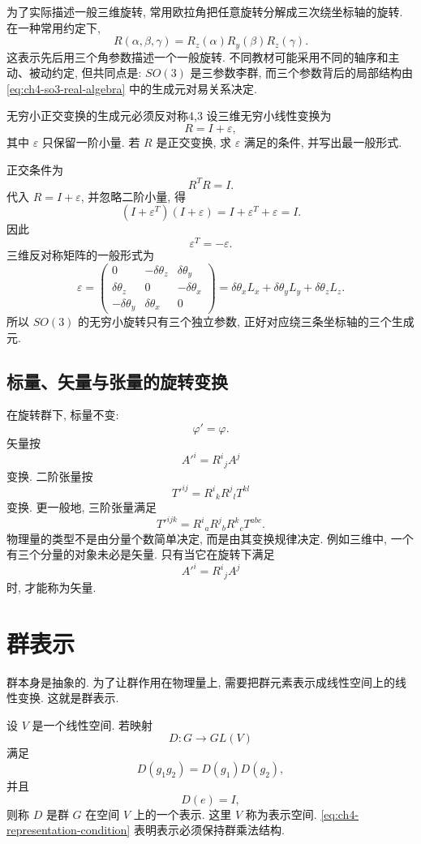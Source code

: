 为了实际描述一般三维旋转, 常用欧拉角把任意旋转分解成三次绕坐标轴的旋转. 在一种常用约定下,
\[
R(\alpha,\beta,\gamma)
=
R_z(\alpha)R_y(\beta)R_z(\gamma).
\]
这表示先后用三个角参数描述一个一般旋转. 不同教材可能采用不同的轴序和主动、被动约定, 但共同点是: $SO(3)$ 是三参数李群, 而三个参数背后的局部结构由 \eqref{eq:ch4-so3-real-algebra} 中的生成元对易关系决定. 

\begin{example}{无穷小正交变换的生成元必须反对称}{4,3}
设三维无穷小线性变换为
\[
R=I+\varepsilon,
\]
其中 $\varepsilon$ 只保留一阶小量. 若 $R$ 是正交变换, 求 $\varepsilon$ 满足的条件, 并写出最一般形式. 
\begin{solution}
正交条件为
\[
R^TR=I.
\]
代入 $R=I+\varepsilon$, 并忽略二阶小量, 得
\[
(I+\varepsilon^T)(I+\varepsilon)
=
I+\varepsilon^T+\varepsilon
=I.
\]
因此
\[
\varepsilon^T=-\varepsilon.
\]
三维反对称矩阵的一般形式为
\[
\varepsilon=
\begin{pmatrix}
0&-\delta\theta_z&\delta\theta_y\\
\delta\theta_z&0&-\delta\theta_x\\
-\delta\theta_y&\delta\theta_x&0
\end{pmatrix}
=
\delta\theta_xL_x+\delta\theta_yL_y+\delta\theta_zL_z.
\]
所以 $SO(3)$ 的无穷小旋转只有三个独立参数, 正好对应绕三条坐标轴的三个生成元. 
\end{solution}
\end{example}

\subsection{标量、矢量与张量的旋转变换}

在旋转群下, 标量不变: 
\[
\varphi'=\varphi.
\]
矢量按
\[
A'^i=R^i{}_jA^j
\]
变换. 二阶张量按
\[
T'^{ij}=R^i{}_kR^j{}_lT^{kl}
\]
变换. 更一般地, 三阶张量满足
\[
T'^{ijk}
=
R^i{}_aR^j{}_bR^k{}_cT^{abc}.
\]
物理量的类型不是由分量个数简单决定, 而是由其变换规律决定. 例如三维中, 一个有三个分量的对象未必是矢量. 只有当它在旋转下满足
\[
A'^i=R^i{}_jA^j
\]
时, 才能称为矢量. 

\section{群表示}

群本身是抽象的. 为了让群作用在物理量上, 需要把群元素表示成线性空间上的线性变换. 这就是群表示. 

设 $V$ 是一个线性空间. 若映射
\[
D:G\to GL(V)
\]
满足
\begin{equation}
\label{eq:ch4-representation-condition}
D(g_1g_2)=D(g_1)D(g_2),
\end{equation}
并且
\[
D(e)=I,
\]
则称 $D$ 是群 $G$ 在空间 $V$ 上的一个表示. 这里 $V$ 称为表示空间. \eqref{eq:ch4-representation-condition} 表明表示必须保持群乘法结构. 


